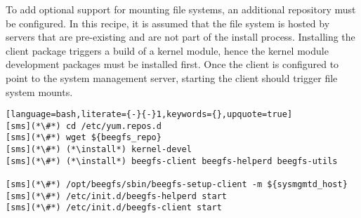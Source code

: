 To add optional support for mounting \beegfs{} file systems, an 
additional \pkgmgr{} repository must be configured. In this recipe, it is
assumed that the \beegfs{} file system is hosted by servers that are pre-existing
and are not part of the install process. Installing the client package triggers
a build of a kernel module, hence the kernel module development packages must be
installed first. Once the client is configured to point 
to the \beegfs{} system management server, starting the client should trigger file 
system mounts.

\begin{lstlisting}[language=bash,literate={-}{-}1,keywords={},upquote=true]
[sms](*\#*) cd /etc/yum.repos.d
[sms](*\#*) wget ${beegfs_repo}
[sms](*\#*) (*\install*) kernel-devel
[sms](*\#*) (*\install*) beegfs-client beegfs-helperd beegfs-utils

[sms](*\#*) /opt/beegfs/sbin/beegfs-setup-client -m ${sysmgmtd_host}
[sms](*\#*) /etc/init.d/beegfs-helperd start
[sms](*\#*) /etc/init.d/beegfs-client start
\end{lstlisting}
